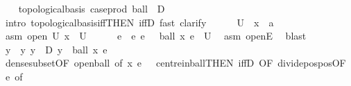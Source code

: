 \begin{isabellebody}
\ \ \isamarkupfalse%
\ {\isachardoublequoteopen}topological{\isacharunderscore}{\kern0pt}basis\ {\isacharparenleft}{\kern0pt}case{\isacharunderscore}{\kern0pt}prod\ ball\ {\isacharbackquote}{\kern0pt}\ {\isacharparenleft}{\kern0pt}D\ {\isasymtimes}\ {\isacharparenleft}{\kern0pt}{\isasymrat}\ {\isasyminter}\ {\isacharbraceleft}{\kern0pt}{}{\isacharless}{\kern0pt}{\isachardot}{\kern0pt}{\isachardot}{\kern0pt}{\isacharbraceright}{\kern0pt}{\isacharparenright}{\kern0pt}{\isacharparenright}{\kern0pt}{\isacharparenright}{\kern0pt}{\isachardoublequoteclose}\isanewline
\ \ \isamarkupfalse%
\ {\isacharparenleft}{\kern0pt}intro\ topological{\isacharunderscore}{\kern0pt}basis{\isacharunderscore}{\kern0pt}iff{\isacharbrackleft}{\kern0pt}THEN\ iffD{}{\isacharbrackright}{\kern0pt}{\isacharcomma}{\kern0pt}\ fast{\isacharcomma}{\kern0pt}\ clarify{\isacharparenright}{\kern0pt}\isanewline
\ \ \ \ \isamarkupfalse%
\ U\ \ x\ {\isacharcolon}{\kern0pt}{\isacharcolon}{\kern0pt}\ {\isacharprime}{\kern0pt}a\ \isamarkupfalse%
\ asm{\isacharcolon}{\kern0pt}\ {\isachardoublequoteopen}open\ U{\isachardoublequoteclose}\ {\isachardoublequoteopen}x\ {\isasymin}\ U{\isachardoublequoteclose}\isanewline
\ \ \ \ \isamarkupfalse%
\ e\ \ e{\isacharcolon}{\kern0pt}\ {\isachardoublequoteopen}e\ {\isachargreater}{\kern0pt}\ {}{\isachardoublequoteclose}\ {\isachardoublequoteopen}ball\ x\ e\ {\isasymsubseteq}\ U{\isachardoublequoteclose}\ \isamarkupfalse%
\ asm\ openE\ \isamarkupfalse%
\ blast\isanewline
\ \ \ \ \isamarkupfalse%
\ y\ \ y{\isacharcolon}{\kern0pt}\ {\isachardoublequoteopen}y\ {\isasymin}\ D{\isachardoublequoteclose}\ {\isachardoublequoteopen}y\ {\isasymin}\ ball\ x\ {\isacharparenleft}{\kern0pt}e\ {\isacharslash}{\kern0pt}\ {}{\isacharparenright}{\kern0pt}{\isachardoublequoteclose}\ \isamarkupfalse%
\ dense{\isacharunderscore}{\kern0pt}subset{\isacharparenleft}{\kern0pt}{}{\isacharparenright}{\kern0pt}{\isacharbrackleft}{\kern0pt}OF\ open{\isacharunderscore}{\kern0pt}ball{\isacharcomma}{\kern0pt}\ of\ x\ {\isachardoublequoteopen}e\ {\isacharslash}{\kern0pt}\ {}{\isachardoublequoteclose}{\isacharbrackright}{\kern0pt}\ centre{\isacharunderscore}{\kern0pt}in{\isacharunderscore}{\kern0pt}ball{\isacharbrackleft}{\kern0pt}THEN\ iffD{}{\isacharcomma}{\kern0pt}\ OF\ divide{\isacharunderscore}{\kern0pt}pos{\isacharunderscore}{\kern0pt}pos{\isacharbrackleft}{\kern0pt}OF\ e{\isacharparenleft}{\kern0pt}{}{\isacharparenright}{\kern0pt}{\isacharcomma}{\kern0pt}\ of\ {}{\isacharbrackright}{\kern0pt}{\isacharbrackright}{\kern0pt}\ \isamarkupfalse%

\end{isabellebody}
